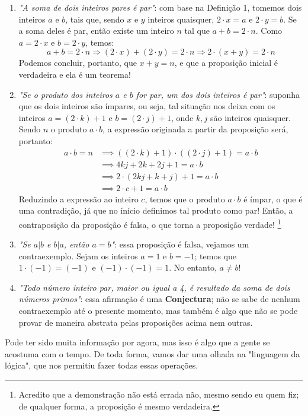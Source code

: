 \documentclass[13pt,letterpaper]{article}
\begin{document}
\begin{enumerate}
    \item \emph{"A soma de dois inteiros pares é par"}: com base na Definição 1, tomemos dois inteiros $a$ e $b$, tais que, sendo $x$ e $y$ inteiros quaisquer, $2 \cdot x = a$ e $2 \cdot y = b$. Se a soma deles é par, então existe um inteiro $n$ tal que $a + b = 2 \cdot n$. Como $a = 2 \cdot x$ e $b = 2 \cdot y$, temos:
    \begin{equation}
        a + b = 2 \cdot n
        \Longrightarrow (2 \cdot x) + (2 \cdot y) = 2 \cdot n
        \Longrightarrow 2 \cdot (x + y) = 2 \cdot n
    \end{equation}
    Podemos concluir, portanto, que $x + y = n$, e que a proposição inicial é verdadeira e ela é um teorema! 
    \item \emph{"Se o produto dos inteiros $a$ e $b$ for par, um dos dois inteiros é par"}: suponha que os dois inteiros são ímpares, ou seja, tal situação nos deixa com os inteiros $a = (2 \cdot k) + 1$ e $b = (2 \cdot j) + 1$, onde $k, j$ são inteiros quaisquer.
    Sendo $n$ o produto $a \cdot b$, a expressão originada a partir da proposição será, portanto:
        \begin{align*}
        a \cdot b = n &\implies 
        ((2 \cdot k) + 1) \cdot ((2 \cdot j) + 1) = a \cdot b \\ &\implies 
        4kj + 2k + 2j + 1 = a \cdot b \\ &\implies
        2 \cdot (2kj + k + j) + 1 = a \cdot b \\ &\implies
        2 \cdot c + 1 = a \cdot b
        \end{align*}
    Reduzindo a expressão ao inteiro $c$, temos que o produto $a \cdot b$ é ímpar, o que é uma contradição, já que no ínício definimos tal produto como par! Então, a contraposição da proposição é falsa, o que torna a proposição verdade!
    \footnote{Acredito que a demonstração não está errada não, mesmo sendo eu quem fiz; de qualquer forma, a proposição é mesmo verdadeira.}
    \item \emph{"Se $a|b$ e $b|a$, então $a = b$"}: essa proposição é falsa, vejamos um contraexemplo. Sejam os inteiros $a = 1$ e $b = -1$; temos que $ 1 \cdot (-1) = (-1)$ e $(-1) \cdot (-1) = 1$. No entanto, $a \ne b$!
    \item \emph{"Todo número inteiro par, maior ou igual a 4, é resultado da soma de dois números primos"}: essa afirmação é uma \textbf{Conjectura}; não se sabe de nenhum contraexemplo até o presente momento, mas também é algo que não se pode provar de maneira abstrata pelas proposições acima nem outras.
\end{enumerate}
Pode ter sido muita informação por agora, mas isso é algo que a gente se acostuma com o tempo. De toda forma, vamos dar uma olhada na "linguagem da lógica", que nos permitiu fazer todas essas operações.
\newpage
\end{document}
